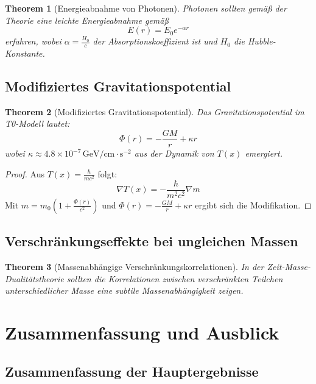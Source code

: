 \documentclass[a4paper,12pt]{article}
\newtheorem{theorem}{Theorem}[section]
\begin{document}
\begin{theorem}[Energieabnahme von Photonen]
	Photonen sollten gemäß der Theorie eine leichte Energieabnahme gemäß
	\begin{equation}
		E(r) = E_0 e^{-\alpha r}
	\end{equation}
	erfahren, wobei \( \alpha = \frac{H_0}{c} \) der Absorptionskoeffizient ist und \( H_0 \) die Hubble-Konstante.
\end{theorem}

\subsection{Modifiziertes Gravitationspotential}

\begin{theorem}[Modifiziertes Gravitationspotential]
	Das Gravitationspotential im T0-Modell lautet:
	\begin{equation}
		\Phi(r) = -\frac{G M}{r} + \kappa r
	\end{equation}
	wobei \( \kappa \approx 4.8 \times 10^{-7} \, \text{GeV/cm} \cdot \text{s}^{-2} \) aus der Dynamik von \( T(x) \) emergiert.
\end{theorem}

\begin{proof}
	Aus \( T(x) = \frac{\hbar}{m c^2} \) folgt:
	\begin{equation}
		\nabla T(x) = -\frac{\hbar}{m^2 c^2} \nabla m
	\end{equation}
	Mit \( m = m_0 (1 + \frac{\Phi(r)}{c^2}) \) und \( \Phi(r) = -\frac{G M}{r} + \kappa r \) ergibt sich die Modifikation.
\end{proof}

\subsection{Verschränkungseffekte bei ungleichen Massen}

\begin{theorem}[Massenabhängige Verschränkungskorrelationen]
	In der Zeit-Masse-Dualitätstheorie sollten die Korrelationen zwischen verschränkten Teilchen unterschiedlicher Masse eine subtile Massenabhängigkeit zeigen.
\end{theorem}

\section{Zusammenfassung und Ausblick}

\subsection{Zusammenfassung der Hauptergebnisse}
\end{document}
